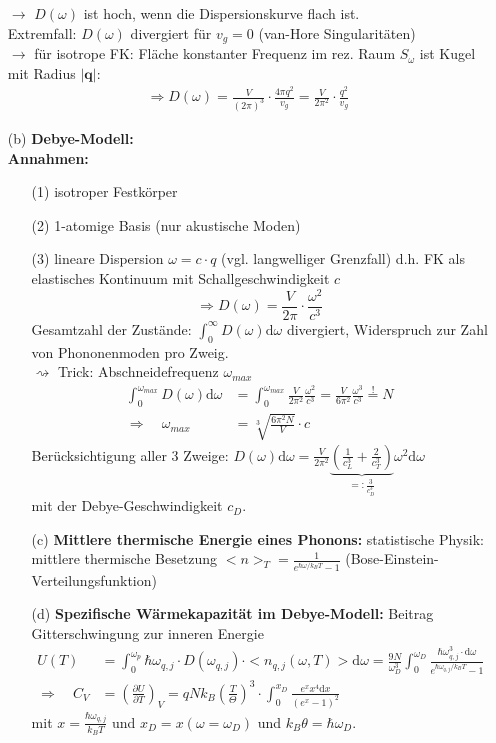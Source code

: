 \begin{itemize}
$\rightarrow$ $D(\omega)$ ist hoch, wenn die Dispersionskurve flach ist.\\
Extremfall: $D(\omega)$ divergiert für $v_g = 0$ (van-Hore Singularitäten)\\
$\rightarrow$ für isotrope FK: Fläche konstanter Frequenz im rez. Raum $S_{\omega}$ ist Kugel mit Radius $|\textbf{q}|$:
\begin{align}
	\Rightarrow D(\omega) = \frac{V}{(2\pi)^3} \cdot \frac{4\pi q^2}{v_g} = \frac{V}{2\pi^2} \cdot \frac{q^2}{v_g}
\end{align}
\item[(b)] \textbf{Debye-Modell:}\\
\textbf{Annahmen:} \begin{itemize}
	\item[(1)] isotroper Festkörper
	\item[(2)] 1-atomige Basis (nur akustische Moden)
	\item[(3)] lineare Dispersion $\omega = c \cdot q$ (vgl. langwelliger Grenzfall) d.h. FK als elastisches Kontinuum mit Schallgeschwindigkeit $c$
	$$\Rightarrow D(\omega) = \frac{V}{2 \pi} \cdot \frac{\omega^2}{c^3}$$
	Gesamtzahl der Zustände: $\int_0^\infty D(\omega)\mathrm{d}\omega$ divergiert, Widerspruch zur Zahl von Phononenmoden pro Zweig. \\
	$\rightsquigarrow$ Trick: Abschneidefrequenz $\omega_{max}$\\
	\begin{align*}
		\int_0^{\omega_{max}} D(\omega)\mathrm{d}\omega &= \int_0^{\omega_{max}} \frac{V}{2 \pi^2} \frac{\omega^2}{c^3} = \frac{V}{6 \pi^2} \frac{\omega^3}{c^3} \overset{!}{=} N\\
		\Rightarrow \quad \omega_{max} &= \sqrt[3]{\frac{6 \pi^2 N}{V}} \cdot c
	\end{align*}
	Berücksichtigung aller 3 Zweige: $D(\omega)\mathrm{d}\omega = \frac{V}{2\pi^2} \underbrace{\left(\frac{1}{c_L^3} + \frac{2}{c_T^3}\right)}_{=: \frac{3}{c_D^3}} \omega^2\mathrm{d}\omega$\\
	mit der Debye-Geschwindigkeit $c_D$.

\item[(c)]\textbf{Mittlere thermische Energie eines Phonons:}
	statistische Physik: mittlere thermische Besetzung $<n>_T = \frac{1}{e^{\hbar\omega/k_BT}-1}$ (Bose-Einstein-Verteilungsfunktion)

\item[(d)]\textbf{Spezifische Wärmekapazität im Debye-Modell:}
	Beitrag Gitterschwingung zur inneren Energie
	\begin{align}
		U(T) &= \int_0^{\omega_p} \hbar\omega_{q,j} \cdot D(\omega_{q,j}) \cdot <n_{q,j}(\omega,T)> \mathrm{d}\omega = \frac{9N}{\omega_D^3} \int_0^{\omega_D} \frac{\hbar\omega_{q,j}^3\cdot\mathrm{d}\omega}{e^{\hbar\omega_{q,j}/k_BT}-1} \\
		\Rightarrow \quad C_V &= \left(\frac{\partial U}{\partial T}\right)_V = q N k_B \left(\frac{T}{\Theta}\right)^3 \cdot \int_0^{x_D} \frac{e^x x^4 \mathrm{d}x}{(e^x-1)^2}
	\end{align}
	mit $x = \frac{\hbar\omega_{q,j}}{k_BT}$ und $x_D = x(\omega=\omega_D)$ und $k_B\theta = \hbar\omega_D$.


\end{itemize}
\end{itemize}
